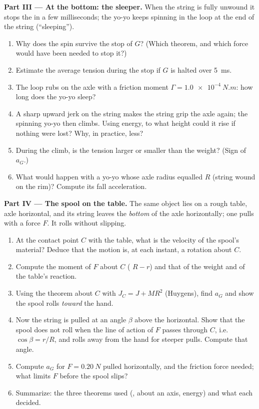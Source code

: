 \begin{problem}
\medskip
\noindent\textbf{Part III --- At the bottom: the sleeper.}
When the string is fully unwound it stops the  in a few
milliseconds; the yo-yo keeps spinning in the loop at the end of the
string (``sleeping'').
\begin{enumerate}[resume]
  \item Why does the spin survive the stop of $G$? (Which theorem, and
        which force would have been needed to stop it?)
  \item Estimate the average tension during the stop if $G$ is halted
        over \qty{5}{ms}.
  \item The loop rubs on the axle with a friction moment $\Gamma =
        \qty{1.0e-4}{N.m}$: how long does the yo-yo sleep?
  \item A sharp upward jerk on the string makes the string grip the axle
        again; the spinning yo-yo then climbs. Using energy, to what
        height could it rise if nothing were lost? Why, in practice,
        less?
  \item During the climb, is the tension larger or smaller than the
        weight? (Sign of $a_G$.)
  \item What would happen with a yo-yo whose axle radius equalled $R$
        (string wound on the rim)? Compute its fall acceleration.
\end{enumerate}

\medskip
\noindent\textbf{Part IV --- The spool on the table.}
The same object lies on a rough table, axle horizontal, and its string
leaves the \emph{bottom} of the axle horizontally; one pulls with a
force $F$. It rolls without slipping.
\begin{enumerate}[resume]
  \item At the contact point $C$ with the table, what is the velocity
        of the spool's material? Deduce that the motion is, at each
        instant, a rotation about $C$.
  \item Compute the moment of $F$ about $C$ ( $R - r$) and that
        of the weight and of the table's reaction.
  \item Using the  theorem about $C$ with $J_C = J +
        MR^2$ (Huygens), find $a_G$ and show the spool rolls
        \emph{toward} the hand.
  \item Now the string is pulled at an angle $\beta$ above the
        horizontal. Show that the spool does not roll when the line of
        action of $F$ passes through $C$, i.e.\ $\cos\beta = r/R$, and
        rolls away from the hand for steeper pulls. Compute that angle.
  \item Compute $a_G$ for $F = \qty{0.20}{N}$ pulled horizontally, and
        the friction force needed; what limits $F$ before the spool
        slips?
  \item Summarize: the three theorems used (,  about an axis, energy) and what each decided.
\end{enumerate}
\end{problem}
